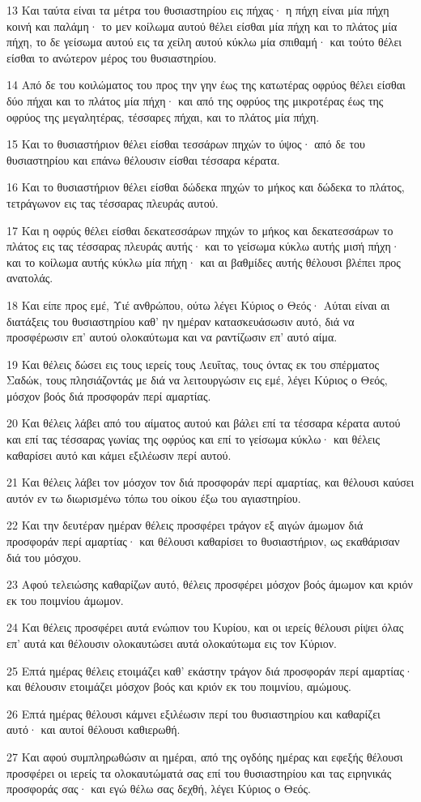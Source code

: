 \par 13 Και ταύτα είναι τα μέτρα του θυσιαστηρίου εις πήχας· η πήχη είναι μία πήχη κοινή και παλάμη· το μεν κοίλωμα αυτού θέλει είσθαι μία πήχη και το πλάτος μία πήχη, το δε γείσωμα αυτού εις τα χείλη αυτού κύκλω μία σπιθαμή· και τούτο θέλει είσθαι το ανώτερον μέρος του θυσιαστηρίου.
\par 14 Από δε του κοιλώματος του προς την γην έως της κατωτέρας οφρύος θέλει είσθαι δύο πήχαι και το πλάτος μία πήχη· και από της οφρύος της μικροτέρας έως της οφρύος της μεγαλητέρας, τέσσαρες πήχαι, και το πλάτος μία πήχη.
\par 15 Και το θυσιαστήριον θέλει είσθαι τεσσάρων πηχών το ύψος· από δε του θυσιαστηρίου και επάνω θέλουσιν είσθαι τέσσαρα κέρατα.
\par 16 Και το θυσιαστήριον θέλει είσθαι δώδεκα πηχών το μήκος και δώδεκα το πλάτος, τετράγωνον εις τας τέσσαρας πλευράς αυτού.
\par 17 Και η οφρύς θέλει είσθαι δεκατεσσάρων πηχών το μήκος και δεκατεσσάρων το πλάτος εις τας τέσσαρας πλευράς αυτής· και το γείσωμα κύκλω αυτής μισή πήχη· και το κοίλωμα αυτής κύκλω μία πήχη· και αι βαθμίδες αυτής θέλουσι βλέπει προς ανατολάς.
\par 18 Και είπε προς εμέ, Υιέ ανθρώπου, ούτω λέγει Κύριος ο Θεός· Αύται είναι αι διατάξεις του θυσιαστηρίου καθ' ην ημέραν κατασκευάσωσιν αυτό, διά να προσφέρωσιν επ' αυτού ολοκαύτωμα και να ραντίζωσιν επ' αυτό αίμα.
\par 19 Και θέλεις δώσει εις τους ιερείς τους Λευΐτας, τους όντας εκ του σπέρματος Σαδώκ, τους πλησιάζοντάς με διά να λειτουργώσιν εις εμέ, λέγει Κύριος ο Θεός, μόσχον βοός διά προσφοράν περί αμαρτίας.
\par 20 Και θέλεις λάβει από του αίματος αυτού και βάλει επί τα τέσσαρα κέρατα αυτού και επί τας τέσσαρας γωνίας της οφρύος και επί το γείσωμα κύκλω· και θέλεις καθαρίσει αυτό και κάμει εξιλέωσιν περί αυτού.
\par 21 Και θέλεις λάβει τον μόσχον τον διά προσφοράν περί αμαρτίας, και θέλουσι καύσει αυτόν εν τω διωρισμένω τόπω του οίκου έξω του αγιαστηρίου.
\par 22 Και την δευτέραν ημέραν θέλεις προσφέρει τράγον εξ αιγών άμωμον διά προσφοράν περί αμαρτίας· και θέλουσι καθαρίσει το θυσιαστήριον, ως εκαθάρισαν διά του μόσχου.
\par 23 Αφού τελειώσης καθαρίζων αυτό, θέλεις προσφέρει μόσχον βοός άμωμον και κριόν εκ του ποιμνίου άμωμον.
\par 24 Και θέλεις προσφέρει αυτά ενώπιον του Κυρίου, και οι ιερείς θέλουσι ρίψει όλας επ' αυτά και θέλουσιν ολοκαυτώσει αυτά ολοκαύτωμα εις τον Κύριον.
\par 25 Επτά ημέρας θέλεις ετοιμάζει καθ' εκάστην τράγον διά προσφοράν περί αμαρτίας· και θέλουσιν ετοιμάζει μόσχον βοός και κριόν εκ του ποιμνίου, αμώμους.
\par 26 Επτά ημέρας θέλουσι κάμνει εξιλέωσιν περί του θυσιαστηρίου και καθαρίζει αυτό· και αυτοί θέλουσι καθιερωθή.
\par 27 Και αφού συμπληρωθώσιν αι ημέραι, από της ογδόης ημέρας και εφεξής θέλουσι προσφέρει οι ιερείς τα ολοκαυτώματά σας επί του θυσιαστηρίου και τας ειρηνικάς προσφοράς σας· και εγώ θέλω σας δεχθή, λέγει Κύριος ο Θεός.

